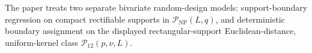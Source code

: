 The paper treats two separate bivariate random-design models: support-boundary regression on compact rectifiable supports in \(\mathcal P_{\mathrm{NP}}(L,q)\), and deterministic boundary assignment on the displayed rectangular-support Euclidean-distance, uniform-kernel class \(\mathcal P_{12}(p,\nu,L)\).